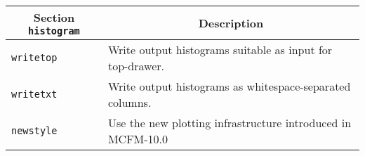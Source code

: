 	\begin{longtable}{p{1.5cm}p{12cm}}
		\hline
		\multicolumn{1}{c}{{\textbf{Section} \texttt{histogram}}} & \multicolumn{1}{c}{{\textbf{Description}}} \\ 
		\hline
		\texttt{writetop} & Write output histograms suitable as input for top-drawer. \\
		\texttt{writetxt} & Write output histograms as whitespace-separated columns. \\
		\texttt{newstyle} & Use the new plotting infrastructure introduced in MCFM-10.0\\
		\hline
	\end{longtable}
